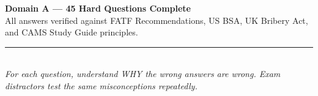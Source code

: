 \documentclass[12pt,aspectratio=169]{beamer}
\begin{document}
	\begin{frame}
		\centering
		\vspace{2.0cm}
		{\fontsize{16}{19}\selectfont \textbf{Domain A --- 45 Hard Questions Complete}}\\[0.3cm]
		{\fontsize{10}{12}\selectfont All answers verified against FATF Recommendations, US BSA, UK Bribery Act, and CAMS Study Guide principles.}\\[0.3cm]
		\rule{4cm}{0.5pt}\\[0.2cm]
		{\fontsize{8}{10}\selectfont \textit{For each question, understand WHY the wrong answers are wrong. Exam distractors test the same misconceptions repeatedly.}}
	\end{frame}
	
\end{document}
